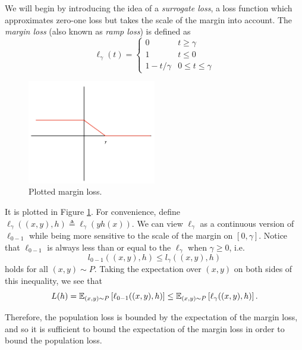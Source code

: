 We will begin by introducing the idea of a \textit{surrogate loss}, a loss function which approximates zero-one loss but takes the scale of the margin into account. The \textit{margin loss} (also known as \textit{ramp loss}) is defined as 
\begin{equation}
    \ell_\gamma(t) = \begin{cases} 
      0 & t\geq \gamma \\
      1 & t\leq 0 \\
      1-t/\gamma & 0\leq t\leq \gamma
   \end{cases}
\end{equation}

\begin{figure}[h!]
    \begin{center}
  \includegraphics[width=0.5\textwidth]{figures/margin_loss.png}
  \end{center}
  \caption{Plotted margin loss.}
  \label{lec6:fig:marginloss}
\end{figure}

It is plotted in Figure \ref{lec6:fig:marginloss}. For convenience, define $\ell_\gamma((x,y), h) \triangleq \ell_\gamma(yh(x))$. We can view $\ell_\gamma$ as a continuous version of $\ell_{0-1}$ while being more sensitive to the scale of the margin on $[0,\gamma]$. Notice that $\ell_{0-1}$ is always less than or equal to the $\ell_\gamma$ when $\gamma\geq 0$, i.e.
\begin{equation}
    l_{0-1}((x,y), h)\leq l_\gamma ((x,y), h)
\end{equation}
holds for all $(x,y)\sim P$. Taking the expectation over $(x,y)$ on both sides of this inequality, we see that
\begin{equation}
    L(h) = \mathbb{E}_{(x,y)\sim P} \left[ \ell_{0-1}((x,y), h) \right] \leq \mathbb{E}_{(x,y)\sim P} \left[ \ell_\gamma ((x,y), h) \right].
\end{equation}

Therefore, the population loss is bounded by the expectation of the margin loss, and so it is sufficient to bound the expectation of the margin loss in order to bound the population loss.

